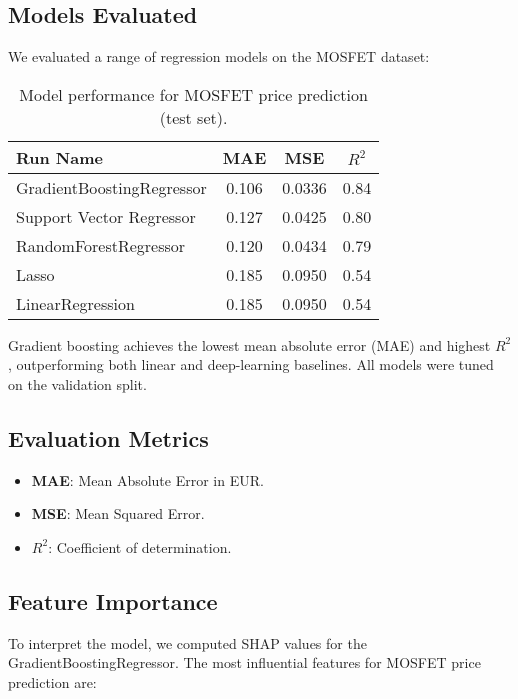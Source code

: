 \subsection{Models Evaluated}
We evaluated a range of regression models on the MOSFET dataset:
\begin{table}[H]
\centering
\caption{Model performance for MOSFET price prediction (test set).}
\label{tab:mosfet-models}
\begin{tabular}{lccc}
\toprule
Run Name & MAE & MSE & $R^2$ \\
\midrule
GradientBoostingRegressor & 0.106 & 0.0336 & 0.84 \\
Support Vector Regressor  & 0.127 & 0.0425 & 0.80 \\
RandomForestRegressor     & 0.120 & 0.0434 & 0.79 \\
Lasso                     & 0.185 & 0.0950 & 0.54 \\
LinearRegression          & 0.185 & 0.0950 & 0.54 \\
\bottomrule
\end{tabular}
\end{table}

Gradient boosting achieves the lowest mean absolute error (MAE) and highest $R^2$, outperforming both linear and deep-learning baselines. All models were tuned on the validation split.

\subsection{Evaluation Metrics}
\begin{itemize}
  \item \textbf{MAE}: Mean Absolute Error in EUR.
  \item \textbf{MSE}: Mean Squared Error.
  \item \textbf{$R^{2}$}: Coefficient of determination.
\end{itemize}

\subsection{Feature Importance}
To interpret the model, we computed SHAP values for the GradientBoostingRegressor. The most influential features for MOSFET price prediction are:

